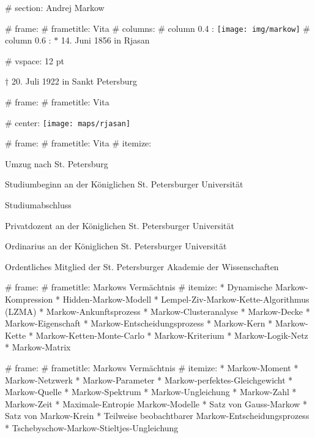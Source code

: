
# section: Andrej Markow

# frame:
  # frametitle: Vita
  # columns:
    # column {0.4 \textwidth}:
      \texttt{[image: img/markow]}
    # column {0.6 \textwidth}:
      $*$ 14. Juni 1856 in Rjasan

      # vspace: 12 pt

      $\dagger$ 20. Juli 1922 in Sankt Petersburg

# frame:
  # frametitle: Vita

  # center:
    \texttt{[image: maps/rjasan]}

# frame:
  # frametitle: Vita
    # itemize:
      \item[1866 (10)] Umzug nach St. Petersburg
      \item[1874 (18)] Studiumbeginn an der Königlichen St. Petersburger Universität
      \item[1878 (22)] Studiumabschluss
      \item[1880 (24)] Privatdozent an der Königlichen St. Petersburger Universität
      \item[1886 (30)] Ordinarius an der Königlichen St. Petersburger Universität
      \item[1896 (40)] Ordentliches Mitglied der St. Petersburger Akademie der Wissenschaften

# frame:
  # frametitle: Markows Vermächtnis
  # itemize:
    * Dynamische Markow-Kompression
    * Hidden-Markow-Modell
    * Lempel-Ziv-Markow-Kette-Algorithmus (LZMA)
    * Markow-Ankunftsprozess
    * Markow-Clusteranalyse
    * Markow-Decke
    * Markow-Eigenschaft
    * Markow-Entscheidungsprozess
    * Markow-Kern
    * Markow-Kette
    * Markow-Ketten-Monte-Carlo
    * Markow-Kriterium
    * Markow-Logik-Netz
    * Markow-Matrix

# frame:
  # frametitle: Markows Vermächtnis
  # itemize:
    * Markow-Moment
    * Markow-Netzwerk
    * Markow-Parameter
    * Markow-perfektes-Gleichgewicht
    * Markow-Quelle
    * Markow-Spektrum
    * Markow-Ungleichung
    * Markow-Zahl
    * Markow-Zeit
    * Maximale-Entropie Markow-Modelle
    * Satz von Gauss-Markow
    * Satz von Markow-Krein
    * Teilweise beobachtbarer Markow-Entscheidungsprozess
    * Tschebyschow-Markow-Stieltjes-Ungleichung


